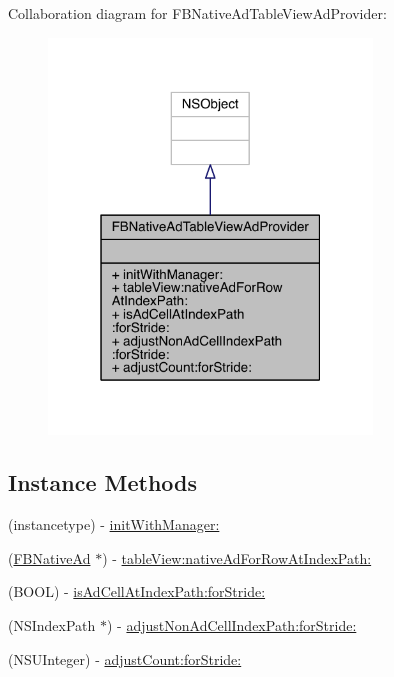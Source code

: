 Collaboration diagram for F\-B\-Native\-Ad\-Table\-View\-Ad\-Provider\-:
\nopagebreak
\begin{figure}[H]
\begin{center}
\leavevmode
\includegraphics[width=244pt]{interface_f_b_native_ad_table_view_ad_provider__coll__graph}
\end{center}
\end{figure}
\subsection*{Instance Methods}
\begin{DoxyCompactItemize}
\item 
(instancetype) -\/ \hyperlink{interface_f_b_native_ad_table_view_ad_provider_acf925814d15f37162d9f315ff78fdfbe}{init\-With\-Manager\-:}
\item 
(\hyperlink{interface_f_b_native_ad}{F\-B\-Native\-Ad} $\ast$) -\/ \hyperlink{interface_f_b_native_ad_table_view_ad_provider_aeab157cdda841471ded7ecab90c55f62}{table\-View\-:native\-Ad\-For\-Row\-At\-Index\-Path\-:}
\item 
(B\-O\-O\-L) -\/ \hyperlink{interface_f_b_native_ad_table_view_ad_provider_aa976a9c43c00d7ac7e1b0ac212e32f7d}{is\-Ad\-Cell\-At\-Index\-Path\-:for\-Stride\-:}
\item 
(N\-S\-Index\-Path $\ast$) -\/ \hyperlink{interface_f_b_native_ad_table_view_ad_provider_a3d9edc2d7670073e4e5b2a3b2c2e2dc4}{adjust\-Non\-Ad\-Cell\-Index\-Path\-:for\-Stride\-:}
\item 
(N\-S\-U\-Integer) -\/ \hyperlink{interface_f_b_native_ad_table_view_ad_provider_ab456a368cd5cd59cd996d11f3d919bfd}{adjust\-Count\-:for\-Stride\-:}
\end{DoxyCompactItemize}


